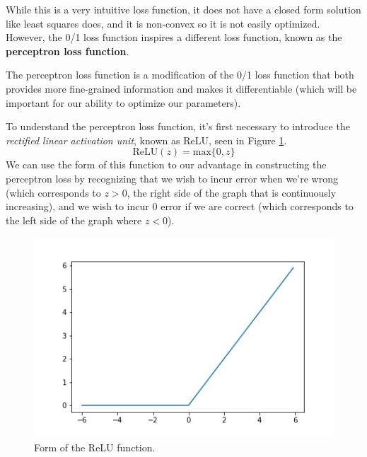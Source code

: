 While this is a very intuitive loss function, it does not have a closed form solution like least squares does, and it is non-convex so it is not easily optimized. However, the 0/1 loss function inspires a different loss function, known as the \textbf{perceptron loss function}.

The perceptron loss function is a modification of the 0/1 loss function that both provides more fine-grained information and makes it differentiable (which will be important for our ability to optimize our parameters).

To understand the perceptron loss function, it's first necessary to introduce the \textit{rectified linear activation unit}, known as ReLU, seen in Figure \ref{fig:relu-fn}.
\begin{equation}
	\text{ReLU}(z) = \text{max}\{0, z\}
\end{equation}
We can use the form of this function to our advantage in constructing the perceptron loss by recognizing that we wish to incur error when we're wrong (which corresponds to $z > 0$, the right side of the graph that is continuously increasing), and we wish to incur 0 error if we are correct (which corresponds to the left side of the graph where $z < 0$).
\begin{figure}
    \centering
    \includegraphics[width=0.5\paperwidth]{../Classification/fig/relu_fn_GEN.jpg}
    \caption{Form of the ReLU function.}
    \label{fig:relu-fn}
\end{figure}

